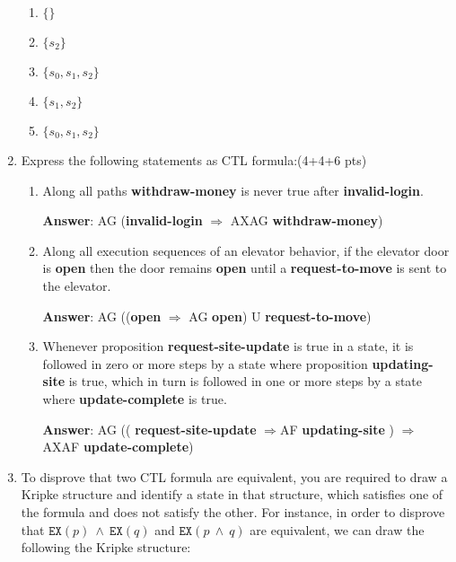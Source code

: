 \documentclass[11pt]{article}
\newcommand{\ex}[1]{\texttt{EX}(#1)}
\begin{document}
\begin{enumerate}
\begin{enumerate}
\item $\{ \}$
  
\item $\{ s_2\}$

\item $\{ s_0, s_1, s_2\}$

\item $\{s_1, s_2\}$
  
\item $\{s_0, s_1, s_2\}$
  
\end{enumerate}

\item Express the following statements as CTL formula:\hfill (4+4+6 pts)
\begin{enumerate}

\item
Along all paths \textbf{withdraw-money} is never true after
\textbf{invalid-login}.

\textbf{Answer}: AG (\textbf{invalid-login} $\Rightarrow$ AXAG  \textbf{withdraw-money})

\item
Along all execution sequences of an elevator behavior, if the elevator
door is \textbf{open} then the door remains \textbf{open} until a
\textbf{request-to-move} is sent to the elevator.

\textbf{Answer}: AG ((\textbf{open} $\Rightarrow$ AG  \textbf{open}) U \textbf{request-to-move})

\item 
Whenever proposition \textbf{request-site-update} is true in a state,
it is followed in zero or more steps by a state where proposition
\textbf{updating-site} is true, which in turn is followed in one or
more steps by a state where \textbf{update-complete} is true.

\textbf{Answer}: AG (( \textbf{request-site-update} $\Rightarrow $AF \textbf{updating-site} ) $\Rightarrow$ AXAF \textbf{update-complete})


\end{enumerate}


\item To disprove that two CTL formula are equivalent, you are
  required to draw a Kripke structure and identify a state in that
  structure, which satisfies one of the formula and does not satisfy
  the other. For instance, in order to disprove that
  $\ex{p}\ \land\ \ex{q}$ and $\ex{p\ \land\ q}$ are equivalent, we can
  draw the following the Kripke structure:


\end{enumerate}
\end{document}
